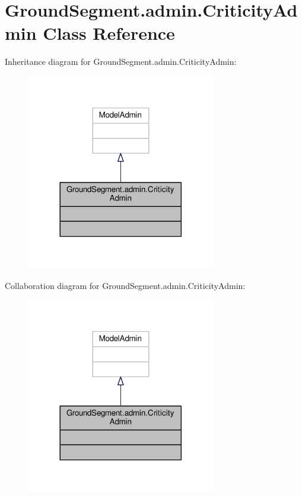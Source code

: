 \hypertarget{class_ground_segment_1_1admin_1_1_criticity_admin}{}\section{Ground\+Segment.\+admin.\+Criticity\+Admin Class Reference}
\label{class_ground_segment_1_1admin_1_1_criticity_admin}


Inheritance diagram for Ground\+Segment.\+admin.\+Criticity\+Admin\+:\nopagebreak
\begin{figure}[H]
\begin{center}
\leavevmode
\includegraphics[width=233pt]{class_ground_segment_1_1admin_1_1_criticity_admin__inherit__graph}
\end{center}
\end{figure}


Collaboration diagram for Ground\+Segment.\+admin.\+Criticity\+Admin\+:\nopagebreak
\begin{figure}[H]
\begin{center}
\leavevmode
\includegraphics[width=233pt]{class_ground_segment_1_1admin_1_1_criticity_admin__coll__graph}
\end{center}
\end{figure}


